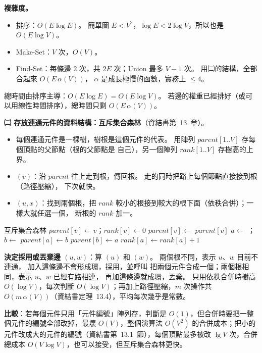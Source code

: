 \begin{pastsoln}
\textbf{複雜度。}
\begin{itemize}
\item 排序：$O(E \log E)$。 簡單圖 $E < V^2$，$\log E < 2 \log V$，所以也是 $O(E \log V)$。
\item Make-Set：$V$ 次，$O(V)$。
\item Find-Set：每條邊 $2$ 次，共 $2E$ 次；Union 最多 $V - 1$ 次。 用㈡的結構，全部合起來 $O(E\, \alpha(V))$，
$\alpha$ 是成長極慢的函數，實務上 $\le 4$。
\end{itemize}
總時間由排序主導：$O(E \log E) = O(E \log V)$。 若邊的權重已經排好（或可以用線性時間排序），總時間只剩
$O(E\, \alpha(V))$。

\textbf{㈡ 存放連通元件的資料結構：互斥集合森林}（資結書第~13~章）。
\begin{itemize}
\item 每個連通元件是一棵樹，樹根是這個元件的代表。 用陣列 $\mathit{parent}[1..V]$ 存每個頂點的父節點（根的父節點是
自己），另一個陣列 $\mathit{rank}[1..V]$ 存樹高的上界。
\item {}$(v)$：沿 $\mathit{parent}$ 往上走到根，傳回根。 走的同時把路上每個節點直接接到根（路徑壓縮），
下次就快。
\item {}$(u, x)$：找到兩個根，把 $\mathit{rank}$ 較小的根接到較大的根下面（依秩合併）；一樣大就任選一個，
新根的 $\mathit{rank}$ 加一。
\end{itemize}
\begin{pseudo}{互斥集合森林}
    \State $\mathit{parent}[v] \gets v$；$\mathit{rank}[v] \gets 0$
\EndProcedure
{}
        \State $\mathit{parent}[v] \gets$  
    \EndIf
    \State \Return $\mathit{parent}[v]$
\EndFunction
{}
    \State $a \gets$ ；$b \gets$ 
        \State $\mathit{parent}[a] \gets b$
    \Else
        \State $\mathit{parent}[b] \gets a$
            \State $\mathit{rank}[a] \gets \mathit{rank}[a] + 1$
        \EndIf
    \EndIf
\EndProcedure
\end{pseudo}
\textbf{決定採用或丟棄邊 $(u, w)$}：算 $(u)$ 和 $(w)$。 兩個根不同，表示 $u$、$w$ 目前不連通，
加入這條邊不會形成環，採用，並呼叫  把兩個元件合成一個；兩個根相同，表示 $u$、$w$ 已經有路相連，
再加這條邊就成環，丟棄。 只用依秩合併時樹高 $O(\log V)$，每次判斷 $O(\log V)$；再加上路徑壓縮，$m$ 次操作共
$O(m\, \alpha(V))$（資結書定理~13.4），平均每次幾乎是常數。

\textbf{比較}：若每個元件只用「元件編號」陣列存，判斷是 $O(1)$，但合併時要把一整個元件的編號全部改掉，最壞
$O(V)$，整個演算法 $O(V^2)$ 的合併成本；把小的元件改成大的元件的編號（資結書第~13.1~節），每個頂點最多被改
$\lg V$ 次，合併總成本 $O(V \log V)$，也可以接受，但互斥集合森林更快。
\end{pastsoln}
